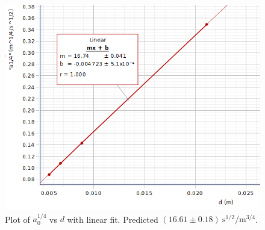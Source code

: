 \documentclass[12pt]{article}
\begin{document}
        \begin{figure}[H]
            \centering
            \includegraphics[width=0.9\linewidth]{fit2.png}
            \captionsetup{justification=centering}
            \caption{Plot of \(a_0^{1/4}\) vs \(d\) with linear fit. Predicted \((16.61 \pm 0.18) \mathrm{~s^{1/2}/m^{3/4}}\).}
        \end{figure}
\end{document}

